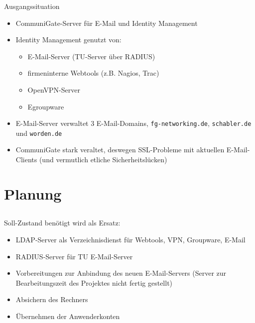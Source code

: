 \documentclass[handout,svgnames]{beamer}
\begin{document}
\begin{frame}{Ausgangssituation}
\begin{itemize}
	\item CommuniGate-Server für E-Mail und Identity Management
	\item Identity Management genutzt von:
	\begin{itemize}
		\item E-Mail-Server (TU-Server über RADIUS)
		\item firmeninterne Webtools (z.B. Nagios, Trac)
		\item OpenVPN-Server
		\item Egroupware
	\end{itemize}
	\item E-Mail-Server verwaltet 3 E-Mail-Domains, \texttt{fg-networking.de}, \texttt{schabler.de} und \texttt{worden.de}
 	\item CommuniGate stark veraltet, deswegen SSL-Probleme mit aktuellen E-Mail-Clients (und vermutlich etliche Sicherheitslücken)
\end{itemize}
\end{frame}


\section{Planung}
\subsection{}
\begin{frame}{Soll-Zustand}
benötigt wird als Ersatz:
\begin{itemize}
	\item LDAP-Server als Verzeichnisdienst für Webtools, VPN, Groupware, E-Mail
	\item RADIUS-Server für TU E-Mail-Server
	\item Vorbereitungen zur Anbindung des neuen E-Mail-Servers (Server zur Bearbeitungszeit des Projektes nicht fertig gestellt)
	\item Absichern des Rechners
	\item Übernehmen der Anwenderkonten
\end{itemize}
\end{frame}
\end{document}
